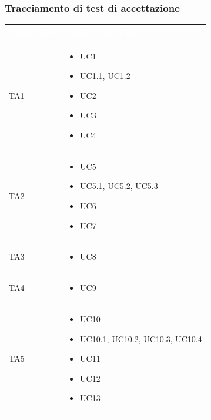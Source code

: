 \newpage

\subsubsection{Tracciamento di test di accettazione}

{
    \setlength{\freewidth}{\dimexpr\textwidth-10\tabcolsep}
    \renewcommand{\arraystretch}{1.5}
    \centering
    \setlength{\aboverulesep}{0pt}
    \setlength{\belowrulesep}{0pt}
    \begin{longtable}{C{.27\freewidth} C{.45\freewidth}}
       \toprule
    \textcolor{white}{\textbf{Codice Test}}&
    \textcolor{white}{\textbf{Codice caso d'uso}}\\
    \toprule
    \endhead

    TA1 & \begin{itemize}
        \item UC1
        \item UC1.1, UC1.2
        \item UC2
        \item UC3
        \item UC4
    \end{itemize} \\

    
    TA2 & \begin{itemize}
        \item UC5
        \item UC5.1, UC5.2, UC5.3
        \item UC6
        \item UC7
    \end{itemize} \\

    
    TA3 & \begin{itemize}
        \item UC8
    \end{itemize} \\

    
    TA4 & \begin{itemize}
        \item UC9
    \end{itemize} \\

    
    TA5 & \begin{itemize}
        \item UC10
        \item UC10.1, UC10.2, UC10.3, UC10.4
        \item UC11
        \item UC12
        \item UC13
    \end{itemize} \\


\end{longtable}}
